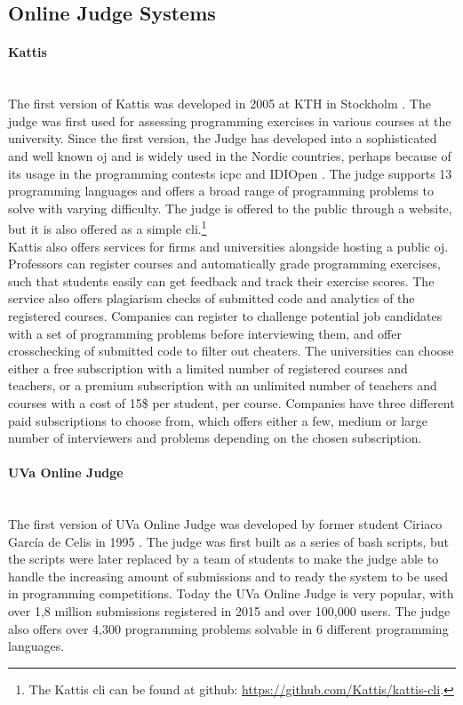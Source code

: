 \subsection{Online Judge Systems}
\paragraph*{Kattis} \hfill \\
The first version of Kattis was developed in 2005 at KTH in Stockholm \cite{a:Enstrom2011}. The judge was first used for assessing programming exercises in various courses at the university. Since the first version, the Judge has developed into a sophisticated and well known \gls{oj} and is widely used in the Nordic countries, perhaps because of its usage in the programming contests \gls{icpc} \cite{ICPC} and IDIOpen \cite{IDIOPEN}. The judge supports 13 programming languages and offers a broad range of programming problems to solve with varying difficulty. The judge is offered to the public through a website, but it is also offered as a simple \gls{cli}.\footnote{The Kattis \gls{cli} can be found at github: \url{https://github.com/Kattis/kattis-cli}.} \\

Kattis also offers services for firms and universities alongside hosting a public \gls{oj}. Professors can register courses and automatically grade programming exercises, such that students easily can get feedback and track their exercise scores. The service also offers plagiarism checks of submitted code and analytics of the registered courses. Companies can register to challenge potential job candidates with a set of programming problems before interviewing them, and offer crosschecking of submitted code to filter out cheaters. The universities can choose either a free subscription with a limited number of registered courses and teachers, or a premium subscription with an unlimited number of teachers and courses with a cost of 15\$ per student, per course. Companies have three different paid subscriptions to choose from, which offers either a few, medium or large number of interviewers and problems depending on the chosen subscription.

\paragraph*{UVa Online Judge} \hfill \\
The first version of UVa Online Judge \cite{UVA} was developed by former student Ciriaco García de Celis in 1995 \cite{a:Revilla2008}. The judge was first built as a series of bash scripts, but the scripts were later replaced by a team of students to make the judge able to handle the increasing amount of submissions and to ready the system to be used in programming competitions. Today the UVa Online Judge is very popular, with over 1,8 million submissions registered in 2015 and over 100,000 users. The judge also offers over 4,300 programming problems solvable in 6 different programming languages.

